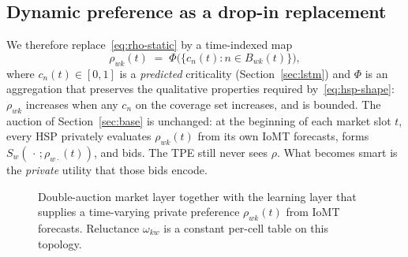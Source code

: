 \documentclass[journal,a4paper,10pt]{IEEEtran}
\begin{document}
\subsection{Dynamic preference as a drop-in replacement}
We therefore replace~\eqref{eq:rho-static} by a time-indexed map
\begin{equation}
  \rho_{wk}(t)
  \;=\;
  \Phi\bigl(\{c_n(t): n\in B_{wk}(t)\}\bigr),
  \label{eq:rho-dyn}
\end{equation}
where \(c_n(t)\in[0,1]\) is a \emph{predicted} criticality (Section~\ref{sec:lstm}) and \(\Phi\) is an aggregation that preserves the qualitative properties required by~\eqref{eq:hsp-shape}: \(\rho_{wk}\) increases when any \(c_n\) on the coverage set increases, and is bounded. The auction of Section~\ref{sec:base} is unchanged: at the beginning of each market slot \(t\), every HSP privately evaluates \(\rho_{wk}(t)\) from its own IoMT forecasts, forms \(S_w(\,\cdot\,;\rho_{w\cdot}(t))\), and bids. The TPE still never sees \(\rho\). What becomes smart is the \emph{private} utility that those bids encode.

\begin{figure}[!t]
\centering
{}
\caption{Double-auction market layer together with the learning layer that supplies a time-varying private preference \(\rho_{wk}(t)\) from IoMT forecasts. Reluctance \(\omega_{kw}\) is a constant per-cell table on this topology.}
\label{fig:pipeline}
\end{figure}
\end{document}
